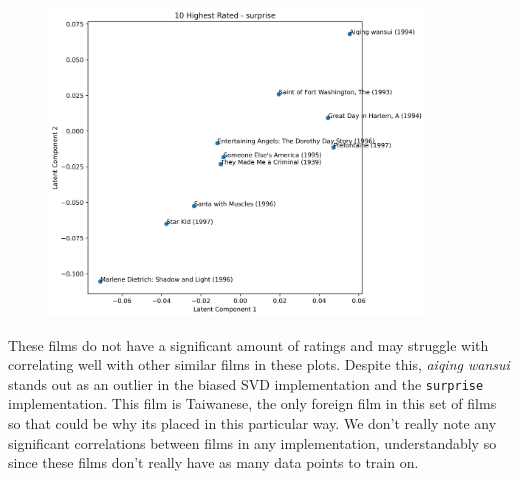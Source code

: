 \begin{figure}[H]
    \centering
\end{figure}
\begin{figure}[H]
    \centering 
    \includegraphics[width=10cm]{most10_sp.png}
\end{figure}

These films do not have a significant amount of ratings and may struggle with correlating well with other similar films in these plots. Despite this, 
\textit{aiqing wansui} stands out as an outlier in the biased SVD implementation and the \texttt{surprise} implementation. This film is Taiwanese, 
the only foreign film in this set of films so that could be why its placed in this particular way. We don't really note any significant correlations 
between films in any implementation, understandably so since these films don't really have as many data points to train on.

